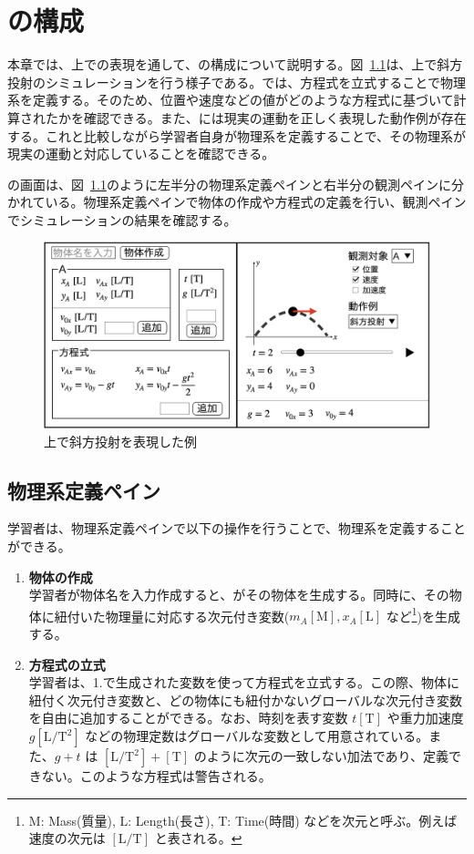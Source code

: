 \chapter{\simname の構成} \label{idea}

本章では、\simname 上での表現を通して、\simname の構成について説明する。図~\ref{simsym_fig1}は、\simname 上で斜方投射のシミュレーションを行う様子である。\simname では、方程式を立式することで物理系を定義する。そのため、位置や速度などの値がどのような方程式に基づいて計算されたかを確認できる。また、\simname には現実の運動を正しく表現した動作例が存在する。これと比較しながら学習者自身が物理系を定義することで、その物理系が現実の運動と対応していることを確認できる。

\simname の画面は、図~\ref{simsym_fig1}のように左半分の物理系定義ペインと右半分の観測ペインに分かれている。物理系定義ペインで物体の作成や方程式の定義を行い、観測ペインでシミュレーションの結果を確認する。

\begin{figure}[bht]
  \centering
  \includegraphics*[width=\linewidth]{work/slide_img5-crop.png}
  \caption{\simname 上で斜方投射を表現した例} \label{simsym_fig1}
\end{figure}

\section{物理系定義ペイン}

学習者は、物理系定義ペインで以下の操作を行うことで、物理系を定義することができる。

\begin{enumerate}
\item \textbf{物体の作成}\\
学習者が物体名を入力作成すると、\simname がその物体を生成する。同時に、その物体に紐付いた物理量に対応する次元付き変数($m_A\mathrm{[M]}, x_A\mathrm{[L]}$ など\footnote{$\mathrm{M}$: Mass(質量), $\mathrm{L}$: Length(長さ), $\mathrm{T}$: Time(時間) などを次元と呼ぶ。例えば速度の次元は $\mathrm{[L/T]}$ と表される。})を生成する。
\item \textbf{方程式の立式}\\
学習者は、1.で生成された変数を使って方程式を立式する。この際、物体に紐付く次元付き変数と、どの物体にも紐付かないグローバルな次元付き変数を自由に追加することができる。なお、時刻を表す変数 $t\mathrm{[T]}$ や重力加速度 $g\mathrm{[L/T^2]}$ などの物理定数はグローバルな変数として用意されている。また、$g + t$ は $\mathrm{[L/T^2]} + \mathrm{[T]}$ のように次元の一致しない加法であり、定義できない。このような方程式は警告される。
\end{enumerate}



